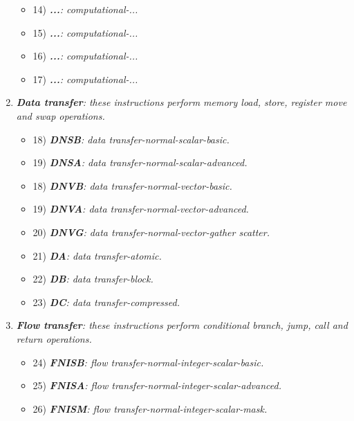 \begin{enumerate}
\begin{itemize}
                    \item 14) \textit{\textbf{...}: computational-...} %
                    \item 15) \textit{\textbf{...}: computational-...}
                    \item 16) \textit{\textbf{...}: computational-...}
                    \item 17) \textit{\textbf{...}: computational-...}

                \end{itemize}

            \item \textit{\textbf{Data transfer}: these instructions perform memory load, store, register move and swap operations.}

                \begin{itemize}

                    \item 18) \textit{\textbf{DNSB}: data transfer-normal-scalar-basic.}
                    \item 19) \textit{\textbf{DNSA}: data transfer-normal-scalar-advanced.}

                    \item 18) \textit{\textbf{DNVB}: data transfer-normal-vector-basic.}
                    \item 19) \textit{\textbf{DNVA}: data transfer-normal-vector-advanced.}
                    \item 20) \textit{\textbf{DNVG}: data transfer-normal-vector-gather scatter.}

                    \item 21) \textit{\textbf{DA}: data transfer-atomic.}
                    \item 22) \textit{\textbf{DB}: data transfer-block.}
                    \item 23) \textit{\textbf{DC}: data transfer-compressed.}

                \end{itemize}

            \item \textit{\textbf{Flow transfer}: these instructions perform conditional branch, jump, call and return operations.}

                \begin{itemize}

                    \item 24) \textit{\textbf{FNISB}: flow transfer-normal-integer-scalar-basic.}
                    \item 25) \textit{\textbf{FNISA}: flow transfer-normal-integer-scalar-advanced.}
                    \item 26) \textit{\textbf{FNISM}: flow transfer-normal-integer-scalar-mask.}


\end{itemize}
\end{enumerate}
